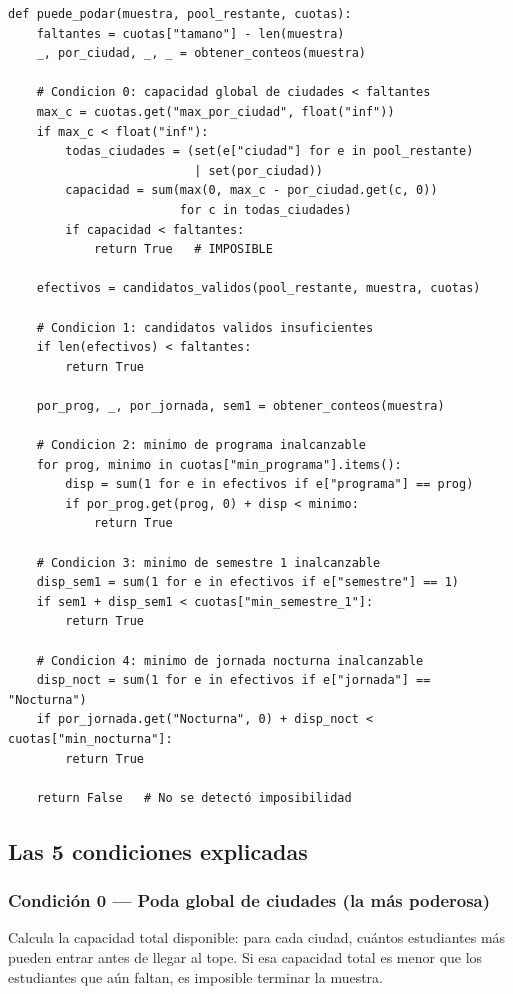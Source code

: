 \documentclass[11pt, a4paper]{article}
\begin{document}
\begin{lstlisting}[style=python]
def puede_podar(muestra, pool_restante, cuotas):
    faltantes = cuotas["tamano"] - len(muestra)
    _, por_ciudad, _, _ = obtener_conteos(muestra)

    # Condicion 0: capacidad global de ciudades < faltantes
    max_c = cuotas.get("max_por_ciudad", float("inf"))
    if max_c < float("inf"):
        todas_ciudades = (set(e["ciudad"] for e in pool_restante)
                          | set(por_ciudad))
        capacidad = sum(max(0, max_c - por_ciudad.get(c, 0))
                        for c in todas_ciudades)
        if capacidad < faltantes:
            return True   # IMPOSIBLE

    efectivos = candidatos_validos(pool_restante, muestra, cuotas)

    # Condicion 1: candidatos validos insuficientes
    if len(efectivos) < faltantes:
        return True

    por_prog, _, por_jornada, sem1 = obtener_conteos(muestra)

    # Condicion 2: minimo de programa inalcanzable
    for prog, minimo in cuotas["min_programa"].items():
        disp = sum(1 for e in efectivos if e["programa"] == prog)
        if por_prog.get(prog, 0) + disp < minimo:
            return True

    # Condicion 3: minimo de semestre 1 inalcanzable
    disp_sem1 = sum(1 for e in efectivos if e["semestre"] == 1)
    if sem1 + disp_sem1 < cuotas["min_semestre_1"]:
        return True

    # Condicion 4: minimo de jornada nocturna inalcanzable
    disp_noct = sum(1 for e in efectivos if e["jornada"] == "Nocturna")
    if por_jornada.get("Nocturna", 0) + disp_noct < cuotas["min_nocturna"]:
        return True

    return False   # No se detectó imposibilidad
\end{lstlisting}

\subsection{Las 5 condiciones explicadas}

\subsubsection{Condición 0 — Poda global de ciudades (la más poderosa)}

Calcula la capacidad total disponible: para cada ciudad, cuántos estudiantes más pueden entrar antes de llegar al tope. Si esa capacidad total es menor que los estudiantes que aún faltan, es imposible terminar la muestra.
\end{document}
